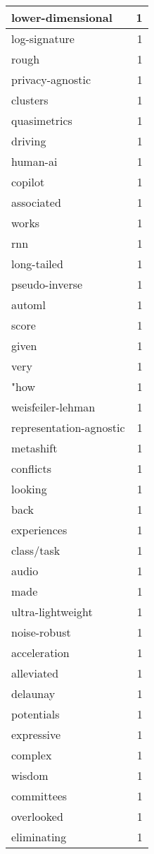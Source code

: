 \begin{table}[h]
\begin{tabular}{|l|r|}
lower-dimensional & 1 \\
\hline
log-signature & 1 \\
\hline
rough & 1 \\
\hline
privacy-agnostic & 1 \\
\hline
clusters & 1 \\
\hline
quasimetrics & 1 \\
\hline
driving & 1 \\
\hline
human-ai & 1 \\
\hline
copilot & 1 \\
\hline
associated & 1 \\
\hline
works & 1 \\
\hline
rnn & 1 \\
\hline
long-tailed & 1 \\
\hline
pseudo-inverse & 1 \\
\hline
automl & 1 \\
\hline
score & 1 \\
\hline
given & 1 \\
\hline
very & 1 \\
\hline
"how & 1 \\
\hline
weisfeiler-lehman & 1 \\
\hline
representation-agnostic & 1 \\
\hline
metashift & 1 \\
\hline
conflicts & 1 \\
\hline
looking & 1 \\
\hline
back & 1 \\
\hline
experiences & 1 \\
\hline
class/task & 1 \\
\hline
audio & 1 \\
\hline
made & 1 \\
\hline
ultra-lightweight & 1 \\
\hline
noise-robust & 1 \\
\hline
acceleration & 1 \\
\hline
alleviated & 1 \\
\hline
delaunay & 1 \\
\hline
potentials & 1 \\
\hline
expressive & 1 \\
\hline
complex & 1 \\
\hline
wisdom & 1 \\
\hline
committees & 1 \\
\hline
overlooked & 1 \\
\hline
eliminating & 1 \\

\end{tabular}
\end{table}
